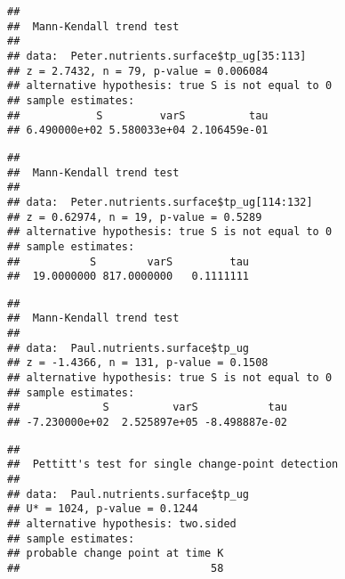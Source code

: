 \documentclass[]{article}
\newenvironment{Shaded}{\begin{snugshade}}{\end{snugshade}}
\newcommand{\KeywordTok}[1]{\textcolor[rgb]{0.13,0.29,0.53}{\textbf{#1}}}
\newcommand{\DecValTok}[1]{\textcolor[rgb]{0.00,0.00,0.81}{#1}}
\newcommand{\CommentTok}[1]{\textcolor[rgb]{0.56,0.35,0.01}{\textit{#1}}}
\newcommand{\OperatorTok}[1]{\textcolor[rgb]{0.81,0.36,0.00}{\textbf{#1}}}
\newcommand{\NormalTok}[1]{#1}
\begin{document}
\begin{verbatim}
## 
##  Mann-Kendall trend test
## 
## data:  Peter.nutrients.surface$tp_ug[35:113]
## z = 2.7432, n = 79, p-value = 0.006084
## alternative hypothesis: true S is not equal to 0
## sample estimates:
##            S         varS          tau 
## 6.490000e+02 5.580033e+04 2.106459e-01
\end{verbatim}

\begin{Shaded}
\end{Shaded}

\begin{verbatim}
## 
##  Mann-Kendall trend test
## 
## data:  Peter.nutrients.surface$tp_ug[114:132]
## z = 0.62974, n = 19, p-value = 0.5289
## alternative hypothesis: true S is not equal to 0
## sample estimates:
##           S        varS         tau 
##  19.0000000 817.0000000   0.1111111
\end{verbatim}

\begin{Shaded}
\end{Shaded}

\begin{verbatim}
## 
##  Mann-Kendall trend test
## 
## data:  Paul.nutrients.surface$tp_ug
## z = -1.4366, n = 131, p-value = 0.1508
## alternative hypothesis: true S is not equal to 0
## sample estimates:
##             S          varS           tau 
## -7.230000e+02  2.525897e+05 -8.498887e-02
\end{verbatim}

\begin{Shaded}
\end{Shaded}

\begin{verbatim}
## 
##  Pettitt's test for single change-point detection
## 
## data:  Paul.nutrients.surface$tp_ug
## U* = 1024, p-value = 0.1244
## alternative hypothesis: two.sided
## sample estimates:
## probable change point at time K 
##                              58
\end{verbatim}
\end{document}
